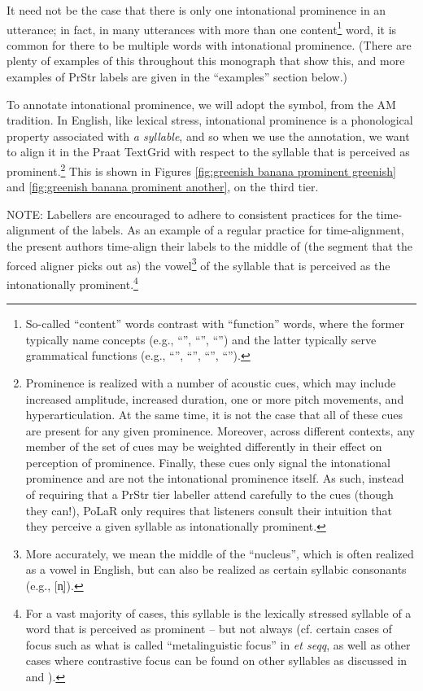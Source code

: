 It need not be the case that there is only one intonational prominence in an utterance; in fact, in many utterances with more than one content\footnote{So-called “content” words contrast with “function” words, where the former typically name concepts (e.g., “”, “”, “”) and the latter typically serve grammatical functions (e.g., “”, “”, “”, “”).} word, it is common for there to be multiple words with intonational prominence. (There are plenty of examples of this throughout this monograph that show this, and more examples of PrStr labels are given in the “examples” section below.)

To annotate intonational prominence, we will adopt the \textlabel{*} symbol, from the AM tradition. In English, like lexical stress, intonational prominence is a phonological property associated with \textit{a syllable}, and so when we use the \textlabel{*} annotation, we want to align it in the Praat TextGrid with respect to the syllable that is perceived as prominent.\footnote{Prominence is realized with a number of acoustic cues, which may include increased amplitude, increased duration, one or more pitch movements, and hyperarticulation. At the same time, it is not the case that all of these cues are present for any given prominence. Moreover, across different contexts, any member of the set of cues may be weighted differently in their effect on perception of prominence. Finally, these cues only signal the intonational prominence and are not the intonational prominence itself. As such, instead of requiring that a PrStr tier labeller attend carefully to the cues (though they can!), PoLaR only requires that listeners consult their intuition that they perceive a given syllable as intonationally prominent.\label{fn:prominence cues}} This is shown in Figures \ref{fig:greenish banana prominent greenish} and \ref{fig:greenish banana prominent another}, on the third tier.

NOTE: Labellers are encouraged to adhere to consistent practices for the time-alignment of the \textlabel{*} labels. As an example of a regular practice for time-alignment, the present authors time-align their \textlabel{*} labels to the middle of (the segment that the forced aligner picks out as) the vowel\footnote{More accurately, we mean the middle of the “nucleus”, which is often realized as a vowel in English, but can also be realized as certain syllabic consonants (e.g., [n̩]).} of the syllable that is perceived as the intonationally prominent.\footnote{For a vast majority of cases, this syllable is the lexically stressed syllable of a word that is perceived as prominent – but not always (cf. certain cases of focus such as what is called “metalinguistic focus” in \citealt{erteschik-shir99} \textit{et seqq}, as well as other cases where contrastive focus can be found on other syllables as discussed in \citealt{armstrongschwenter16} and \citealt{ahn-21a}).}

